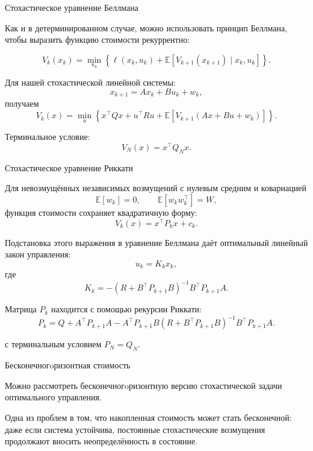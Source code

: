 \documentclass{beamer}
\begin{document}
	
	
	
	\begin{frame}{Стохастическое уравнение Беллмана}
		\begin{flushleft}
			
			Как и в детерминированном случае, можно использовать принцип Беллмана,
			чтобы выразить функцию стоимости рекуррентно:
			
			\[
			V_k(x_k) =
			\min_{u_k}
			\left\{
			\ell(x_k,u_k)
			+ \mathbb{E}\left[
			V_{k+1}(x_{k+1}) \mid x_k,u_k
			\right]
			\right\}.
			\]
			
			Для нашей стохастической линейной системы:
			\[
			x_{k+1}=Ax_k+Bu_k+w_k,
			\]
			получаем
			\[
			\boxed{
				V_k(x) =
				\min_u
				\left\{
				x^\top Qx+u^\top Ru
				+\mathbb{E}\left[
				V_{k+1}(Ax+Bu+w_k)
				\right]
				\right\}.
			}
			\]
			
			Терминальное условие:
			\[
			V_N(x)=x^\top Q_Nx.
			\]
			
		\end{flushleft}
	\end{frame}
	
	\begin{frame}{Стохастическое уравнение Риккати}
		\begin{flushleft}
			Для невозмущённых независимых возмущений с нулевым средним и ковариацией
			\[
			\mathbb{E}[w_k]=0,\qquad
			\mathbb{E}[w_kw_k^\top]=W,
			\]
			функция стоимости сохраняет квадратичную форму:
			\[
			\boxed{
				V_k(x)=x^\top P_kx+c_k.
			}
			\]
			
			Подстановка этого выражения в уравнение Беллмана даёт
			оптимальный линейный закон управления:
			\[
			u_k=K_kx_k,
			\]
			где
			\[
			K_k =
			-(R+B^\top P_{k+1}B)^{-1}
			B^\top P_{k+1}A.
			\]
			
			Матрица $P_k$ находится с помощью рекурсии Риккати:
			\[
			P_k=Q+A^\top P_{k+1}A
			-A^\top P_{k+1}B
			(R+B^\top P_{k+1}B)^{-1}
			B^\top P_{k+1}A.
			\]
			
			с терминальным условием $P_N=Q_N$.
		\end{flushleft}
	\end{frame}
	
	
	\begin{frame}{Бесконечногoризонтная стоимость}
		\begin{flushleft}
			
				Можно рассмотреть бесконечногoризонтную версию стохастической
				задачи оптимального управления.
				
				\bigskip
				
				Одна из проблем в том, что накопленная стоимость может стать бесконечной:
				даже если система устойчива, постоянные стохастические возмущения
				продолжают вносить неопределённость в состояние.
				
				
		\end{flushleft}
	\end{frame}
	
\end{document}
